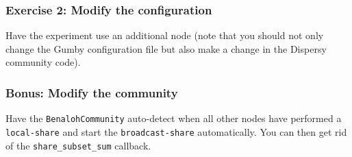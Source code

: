 \documentclass{article}
\begin{document}
\subsubsection{Exercise 2: Modify the configuration}
Have the experiment use an additional node (note that you should not only change the Gumby configuration file but also make a change in the Dispersy community code).

\subsubsection{Bonus: Modify the community}
Have the \texttt{BenalohCommunity} auto-detect when all other nodes have performed a \texttt{local-share} and start the \texttt{broadcast-share} automatically.
You can then get rid of the \texttt{share\_subset\_sum} callback.


{\small }
\end{document}
